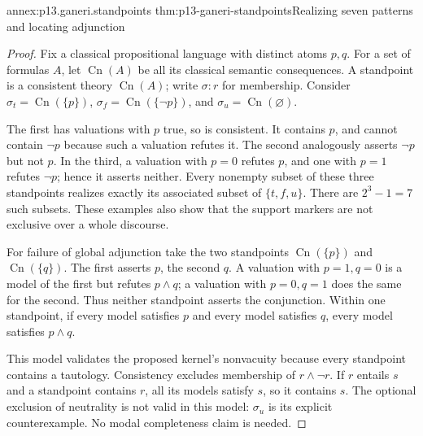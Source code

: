 \begin{annexitem}{annex:p13.ganeri.standpoints}
 {thm:p13-ganeri-standpoints}{Realizing seven patterns and locating adjunction}
\begin{proof}
Fix a classical propositional language with distinct atoms \(p,q\).
For a set of formulas \(A\), let \(\operatorname{Cn}(A)\) be all its
classical semantic consequences. A standpoint is a consistent theory
\(\operatorname{Cn}(A)\); write \(\sigma:r\) for membership.
Consider \(\sigma_t=\operatorname{Cn}(\{p\})\),
\(\sigma_f=\operatorname{Cn}(\{\neg p\})\), and
\(\sigma_u=\operatorname{Cn}(\varnothing)\).

The first has valuations with \(p\) true, so is consistent. It contains
\(p\), and cannot contain \(\neg p\) because such a valuation refutes it.
The second analogously asserts \(\neg p\) but not \(p\).
In the third, a valuation with \(p=0\) refutes \(p\), and one with \(p=1\)
refutes \(\neg p\); hence it asserts neither. Every nonempty subset
of these three standpoints realizes exactly its associated subset
of \(\{t,f,u\}\). There are \(2^3-1=7\) such subsets. These examples
also show that the support markers are not exclusive over a whole discourse.

For failure of global adjunction take the two standpoints
\(\operatorname{Cn}(\{p\})\) and \(\operatorname{Cn}(\{q\})\).
The first asserts \(p\), the second \(q\). A valuation with \(p=1,q=0\)
is a model of the first but refutes \(p\land q\); a valuation with
\(p=0,q=1\) does the same for the second. Thus neither standpoint
asserts the conjunction.
Within one standpoint, if every model satisfies \(p\) and every model
satisfies \(q\), every model satisfies \(p\land q\).

This model validates the proposed kernel's nonvacuity because every
standpoint contains a tautology. Consistency excludes membership of
\(r\land\neg r\). If \(r\) entails \(s\) and a standpoint contains \(r\),
all its models satisfy \(s\), so it contains \(s\). The optional
exclusion of neutrality is not valid in this model: \(\sigma_u\)
is its explicit counterexample. No modal completeness claim is needed.
\end{proof}
\end{annexitem}

